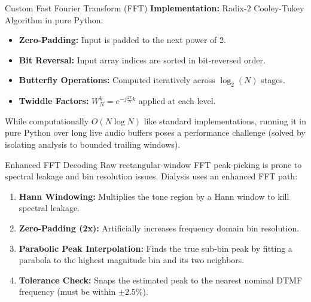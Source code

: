 \documentclass[aspectratio=169]{beamer}
\begin{document}
\begin{frame}{Custom Fast Fourier Transform (FFT)}
    \textbf{Implementation:} Radix-2 Cooley-Tukey Algorithm in pure Python.
    
    \vspace{0.5cm}
    \begin{itemize}
        \item \textbf{Zero-Padding:} Input is padded to the next power of 2.
        \item \textbf{Bit Reversal:} Input array indices are sorted in bit-reversed order.
        \item \textbf{Butterfly Operations:} Computed iteratively across $\log_2(N)$ stages.
        \item \textbf{Twiddle Factors:} $W_N^k = e^{-j\frac{2\pi}{N}k}$ applied at each level.
    \end{itemize}
    \vspace{0.5cm}
    While computationally $O(N \log N)$ like standard implementations, running it in pure Python over long live audio buffers poses a performance challenge (solved by isolating analysis to bounded trailing windows).
\end{frame}

\begin{frame}{Enhanced FFT Decoding}
    Raw rectangular-window FFT peak-picking is prone to spectral leakage and bin resolution issues. Dialysis uses an enhanced FFT path:
    
    \vspace{0.5cm}
    \begin{enumerate}
        \item \textbf{Hann Windowing:} Multiplies the tone region by a Hann window to kill spectral leakage.
        \item \textbf{Zero-Padding (2x):} Artificially increases frequency domain bin resolution.
        \item \textbf{Parabolic Peak Interpolation:} Finds the true sub-bin peak by fitting a parabola to the highest magnitude bin and its two neighbors.
        \item \textbf{Tolerance Check:} Snaps the estimated peak to the nearest nominal DTMF frequency (must be within $\pm 2.5\%$).
    \end{enumerate}
\end{frame}
\end{document}
